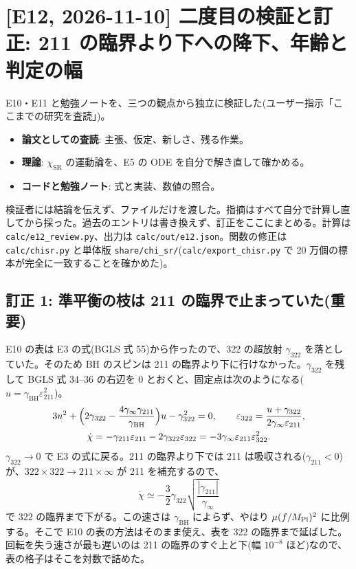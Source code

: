 \section{[E12, 2026-11-10] 二度目の検証と訂正: 211 の臨界より下への降下、年齢と判定の幅}\label{sec:e12}

E10・E11 と勉強ノートを、三つの観点から独立に検証した(ユーザー指示「ここまでの研究を査読」)。
\begin{itemize}
\item \textbf{論文としての査読}: 主張、仮定、新しさ、残る作業。
\item \textbf{理論}: $\chi_\mathrm{SR}$ の運動論を、E5 の ODE を自分で解き直して確かめる。
\item \textbf{コードと勉強ノート}: 式と実装、数値の照合。
\end{itemize}
検証者には結論を伝えず、ファイルだけを渡した。指摘はすべて自分で計算し直してから採った。過去のエントリは書き換えず、訂正をここにまとめる。計算は \texttt{calc/e12\_review.py}、出力は \texttt{calc/out/e12.json}。関数の修正は \texttt{calc/chisr.py} と単体版 \texttt{share/chi\_sr/}(\texttt{calc/export\_chisr.py} で 20 万個の標本が完全に一致することを確かめた)。

\subsection{訂正 1: 準平衡の枝は 211 の臨界で止まっていた(重要)}

E10 の表は E3 の式(BGLS 式 55)から作ったので、322 の超放射 $\gamma_{322}$ を落としていた。そのため BH のスピンは 211 の臨界より下に行けなかった。$\gamma_{322}$ を残して BGLS 式 34--36 の右辺を 0 とおくと、固定点は次のようになる($u=\gamma_\mathrm{BH}\varepsilon_{211}^2$)。
\begin{gather}
3u^2+\Bigl(2\gamma_{322}-\frac{4\gamma_\infty\gamma_{211}}{\gamma_\mathrm{BH}}\Bigr)u-\gamma_{322}^2=0,\qquad
\varepsilon_{322}=\frac{u+\gamma_{322}}{2\gamma_\infty\varepsilon_{211}},\\
\dot\chi=-\gamma_{211}\varepsilon_{211}-2\gamma_{322}\varepsilon_{322}=-3\gamma_\infty\varepsilon_{211}\varepsilon_{322}^2 .
\end{gather}
$\gamma_{322}\to0$ で E3 の式に戻る。211 の臨界より下では 211 は吸収される($\gamma_{211}<0$)が、$322\times322\to211\times\infty$ が 211 を補充するので、
\begin{equation}
\dot\chi\simeq-\frac32\gamma_{322}\sqrt{\frac{|\gamma_{211}|}{\gamma_\infty}}
\end{equation}
で 322 の臨界まで下がる。この速さは $\gamma_\mathrm{BH}$ によらず、やはり $\mu(f/M_\mathrm{Pl})^2$ に比例する。そこで E10 の表の方法はそのまま使え、表を 322 の臨界まで延ばした。回転を失う速さが最も遅いのは 211 の臨界のすぐ上と下(幅 $10^{-8}$ ほど)なので、表の格子はそこを対数で詰めた。

